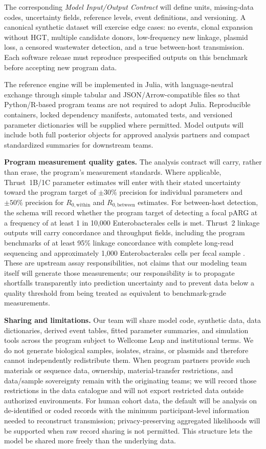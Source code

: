\documentclass[12pt,a4paper]{article}
\begin{document}
The corresponding \emph{Model Input/Output Contract} will define units, missing-data codes, uncertainty fields, reference levels, event definitions, and versioning. A canonical synthetic dataset will exercise edge cases: no events, clonal expansion without HGT, multiple candidate donors, low-frequency new linkage, plasmid loss, a censored wastewater detection, and a true between-host transmission. Each software release must reproduce prespecified outputs on this benchmark before accepting new program data.

The reference engine will be implemented in Julia, with language-neutral exchange through simple tabular and JSON/Arrow-compatible files so that Python/R-based program teams are not required to adopt Julia. Reproducible containers, locked dependency manifests, automated tests, and versioned parameter dictionaries will be supplied where permitted. Model outputs will include both full posterior objects for approved analysis partners and compact standardized summaries for downstream teams.

\textbf{Program measurement quality gates.} The analysis contract will carry, rather than erase, the program's measurement standards. Where applicable, Thrust~1B/1C parameter estimates will enter with their stated uncertainty toward the program target of $\pm30\%$ precision for individual parameters and $\pm50\%$ precision for $R_{0,\mathrm{within}}$ and $R_{0,\mathrm{between}}$ estimates. For between-host detection, the schema will record whether the program target of detecting a focal pARG at a frequency of at least 1 in 10,000 Enterobacterales cells is met. Thrust~2 linkage outputs will carry concordance and throughput fields, including the program benchmarks of at least 95\% linkage concordance with complete long-read sequencing and approximately 1,000 Enterobacterales cells per fecal sample \citep{wellcome2026}. These are upstream assay responsibilities, not claims that our modeling team itself will generate those measurements; our responsibility is to propagate shortfalls transparently into prediction uncertainty and to prevent data below a quality threshold from being treated as equivalent to benchmark-grade measurements.

\textbf{Sharing and limitations.} Our team will share model code, synthetic data, data dictionaries, derived event tables, fitted parameter summaries, and simulation tools across the program subject to Wellcome Leap and institutional terms. We do not generate biological samples, isolates, strains, or plasmids and therefore cannot independently redistribute them. When program partners provide such materials or sequence data, ownership, material-transfer restrictions, and data/sample sovereignty remain with the originating teams; we will record those restrictions in the data catalogue and will not export restricted data outside authorized environments. For human cohort data, the default will be analysis on de-identified or coded records with the minimum participant-level information needed to reconstruct transmission; privacy-preserving aggregated likelihoods will be supported when raw record sharing is not permitted. This structure lets the model be shared more freely than the underlying data.
\end{document}
